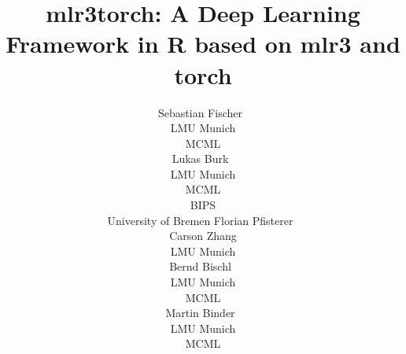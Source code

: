 \documentclass[article]{jss}
\author{Sebastian Fischer~\orcidlink{0000-0002-9609-3197} \\
    LMU Munich \\
    MCML \\
    \And Lukas Burk~\orcidlink{0000-0001-7528-3795} \\
    LMU Munich \\
    MCML\\
    BIPS \\
    University of Bremen
    \And Florian Pfisterer~\orcidlink{0000-0001-8867-762X} \\
    \AND Carson Zhang \\
    LMU Munich \\
    \And Bernd Bischl~\orcidlink{0000-0001-6002-6980} \\
    LMU Munich \\
    MCML \\
    \And Martin Binder~\orcidlink{0009-0008-2578-2869} \\
    LMU Munich \\
    MCML \\
}
\title{mlr3torch: A Deep Learning Framework in R based on mlr3 and torch}
\theoremstyle{definition}
\begin{document}
\begin{comment}

Fullfilled:

\begin{itemize}
    \item Code distributed with JSS articles uses the GNU General Public License (GPL) version 2 or version 3 or a GPL-compatible license. JSS does NOT consider software distributed under other licenses.
\end{itemize}

Final submission:

\begin{itemize}
    \item [ ] Size limit: Upload not more than 50 MB
    \item [ ] submission must contain: pdf manuscript, source code, replication materials
    \item [ ] the manuscript must be fully and exactly reproducible on at least one platform
    \item [ ] We need to provide a simplified version of the script reproducing the results that can run on a regular PC. (https://www.jstatsoft.org/authors#manuscript-preparation) -> maybe I can just run this on GitHub actions CI?
    \item [ ] to facilitate review, authors are strongly encouraged to provide an output file that shows the results from running the single standalone replication script so that this can be compared against the results presented in the manuscript. For R submissions, this should be done by providing a file "code.html" created by running knitr::spin("code.R") on the replication script "code.R" which should include a call to sessionInfo() at the end.
    \item [ ] Source code must be submitted in ASCII files (but need to read software preparation guidelines again after submission: https://www.jstatsoft.org/authors#manuscript-preparation)
    \item [ ] manuscript can be compiled using pdflatex
    \item [ ] Special naming for programming languages and journals (don't think it applies here)
\end{itemize}

JSS Guides:

\begin{itemize}
    \item Should read https://stats-devguide.ropensci.org/ (more as general guidance, not a requirement for packages reviewed by JSS)
    \item !!!discuss the advantages and disadvantages of the new contribution compared to existing implementations, when possible and also applicable using empirical illustrations.
    \item Page limit: not longer than 30 pages
\end{itemize}


\end{comment}
\end{document}
